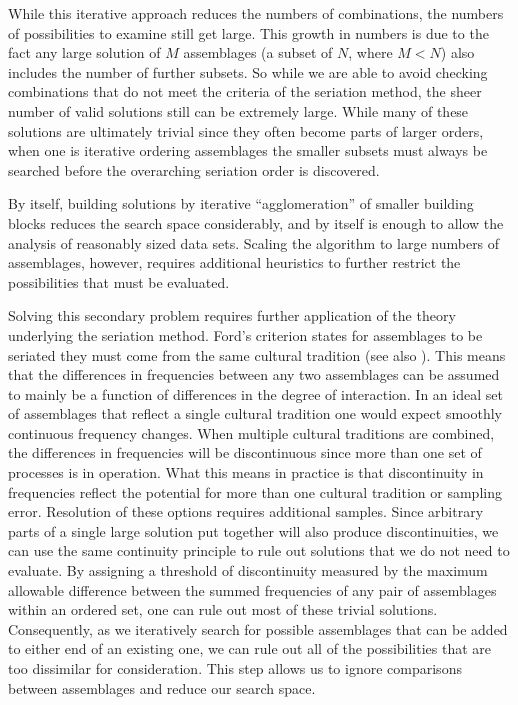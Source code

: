 \documentclass[10pt,letterpaper]{article}
\begin{document}
While this iterative approach reduces the numbers of combinations, the numbers of possibilities to examine still get large. This growth in numbers is due to the fact any large solution of $M$ assemblages (a subset of $N$, where $M<N$) also includes the number of further subsets. So while we are able to avoid checking combinations that do not meet the criteria of the seriation method, the sheer number of valid solutions still can be extremely large. While many of these solutions are ultimately trivial since they often become parts of larger orders, when one is iterative ordering assemblages the smaller subsets must always be searched before the overarching seriation order is discovered. 

By itself, building solutions by iterative “agglomeration” of smaller building blocks reduces the search space considerably, and by itself is enough to allow the analysis of reasonably sized data sets. Scaling the algorithm to large numbers of assemblages, however, requires additional heuristics to further restrict the possibilities that must be evaluated. 

Solving this secondary problem requires further application of the theory underlying the seriation method. Ford’s \cite{Ford1949} criterion states for assemblages to be seriated they must come from the same cultural tradition (see also \cite{Dunnell1970}). This means that the differences in frequencies between any two assemblages can be assumed to mainly be a function of differences in the degree of interaction. In an ideal set of assemblages that reflect a single cultural tradition one would expect smoothly continuous frequency changes. When multiple cultural traditions are combined, the differences in frequencies will be discontinuous since more than one set of processes is in operation. What this means in practice is that discontinuity in frequencies reflect the potential for more than one cultural tradition or sampling error. Resolution of these options requires additional samples. 
Since arbitrary parts of a single large solution put together will also produce discontinuities, we can use the same continuity principle to rule out solutions that we do not need to evaluate. By assigning a threshold of discontinuity measured by the maximum allowable difference between the summed frequencies of any pair of assemblages within an ordered set, one can rule out most of these trivial solutions. Consequently, as we iteratively search for possible assemblages that can be added to either end of an existing one, we can rule out all of the possibilities that are too dissimilar for consideration. This step allows us to ignore comparisons between assemblages and reduce our search space. 
\end{document}
